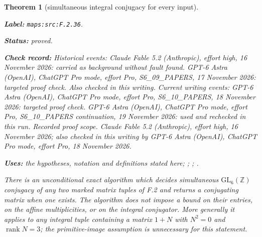 \documentclass[11pt,a4paper]{article}
\newtheorem{theorem}{Theorem}[section]
\theoremstyle{definition}
\newcommand{\StatementRecord}[4]{\par\smallskip\begingroup\upshape\raggedright\noindent\textbf{Label:} \nolinkurl{#1}.\par\noindent\textbf{Status:} #2.\par\noindent\textbf{Check record:} #3.\par\noindent\textbf{Uses:} #4.\par\endgroup\smallskip}
\begin{document}
\begin{theorem}[simultaneous integral conjugacy for every input]\label{maps:src:F.2.36}
\StatementRecord{maps:src:F.2.36}{proved}{Historical events: Claude Fable 5.2 (Anthropic), effort high, 16 November 2026: carried as background without fault found. GPT-6 Astra (OpenAI), ChatGPT Pro mode, effort Pro, S6\_09\_PAPERS, 17 November 2026: targeted proof check. Also checked in this writing. Current writing events: GPT-6 Astra (OpenAI), ChatGPT Pro mode, effort Pro, S6\_10\_PAPERS, 18 November 2026: targeted proof check. GPT-6 Astra (OpenAI), ChatGPT Pro mode, effort Pro, S6\_10\_PAPERS continuation, 19 November 2026: used and rechecked in this run. \emph{Recorded proof scope.} Claude Fable 5.2 (Anthropic), effort high, 16 November 2026; also checked in this writing by GPT-6 Astra (OpenAI), ChatGPT Pro mode, effort Pro, 18 November 2026}{the hypotheses, notation and definitions stated here; \cite[Algorithm 8.3, p.~21]{rootBHJ22}; \cite[Algorithm 8.3 and its correctness proof, p.~21]{rootBHJ22}; \cite[Theorem 3.4, p.~6; Propositions 8.1--8.2, p.~21]{rootBHJ22}}


There is an unconditional exact algorithm which decides simultaneous
$\mathrm{GL}_6(\mathbb Z)$ conjugacy of any two marked matrix tuples of
F.2 and returns a conjugating matrix when one exists. The algorithm
does not impose a bound on their entries, on the affine multiplicities,
or on the integral conjugator. More generally it applies to any integral
tuple containing a matrix $1+N$ with $N^2=0$ and $\operatorname{rank}N=3$;
the primitive-image assumption is unnecessary for this statement.

\end{theorem}
\end{document}
